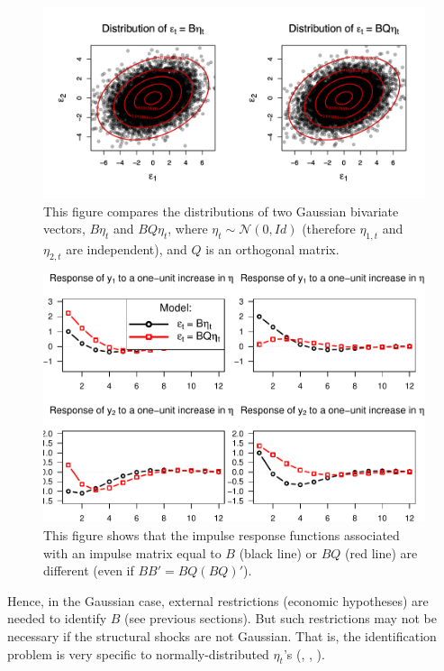 \documentclass[
  12pt,
]{book}
\theoremstyle{definition}
\theoremstyle{definition}
\theoremstyle{definition}
\theoremstyle{definition}
\theoremstyle{remark}
\begin{document}
\begin{figure}
\includegraphics[width=0.95\linewidth]{images/Figure_A} \caption{This figure compares the distributions of two Gaussian bivariate vectors, $B \eta_t$ and $BQ\eta_t$, where $\eta_{t} \sim \mathcal{N}(0,Id)$ (therefore $\eta_{1,t}$ and $\eta_{2,t}$ are independent), and $Q$  is an orthogonal matrix.}\label{fig:preMadeFigureICA}
\end{figure}

\begin{figure}
\includegraphics[width=0.95\linewidth]{IdentifStructShocks_files/figure-latex/preMadeFigureICA2-1} \caption{This figure shows that the impulse response functions associated with an impulse matrix equal to $B$ (black line) or $BQ$ (red line) are different (even if $BB'=BQ(BQ)'$).}\label{fig:preMadeFigureICA2}
\end{figure}

Hence, in the Gaussian case, external restrictions (economic hypotheses) are needed to identify \(B\) (see previous sections). But such restrictions may not be necessary if the structural shocks are not Gaussian. That is, the identification problem is very specific to normally-distributed \(\eta_t\)'s (\citet{Rigobon_2003}, \citet{NORMANDIN20041217}, \citet{Lanne_Lutkepohl_2008}).
\end{document}
